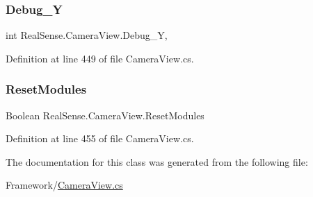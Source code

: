 \subsubsection{\texorpdfstring{Debug\+\_\+Y}{Debug\_Y}}
{\footnotesize\ttfamily int Real\+Sense.\+Camera\+View.\+Debug\+\_\+Y\hspace{0.3cm}{\ttfamily [get]}, {\ttfamily [set]}}



Definition at line 449 of file Camera\+View.\+cs.

\mbox{\label{class_real_sense_1_1_camera_view_a342611e6157bb18b9c097186b3b9bee0}} 
\subsubsection{\texorpdfstring{Reset\+Modules}{ResetModules}}
{\footnotesize\ttfamily Boolean Real\+Sense.\+Camera\+View.\+Reset\+Modules\hspace{0.3cm}{\ttfamily [set]}}



Definition at line 455 of file Camera\+View.\+cs.



The documentation for this class was generated from the following file\+:\begin{DoxyCompactItemize}
\item 
Framework/\hyperlink{_camera_view_8cs}{Camera\+View.\+cs}\end{DoxyCompactItemize}
